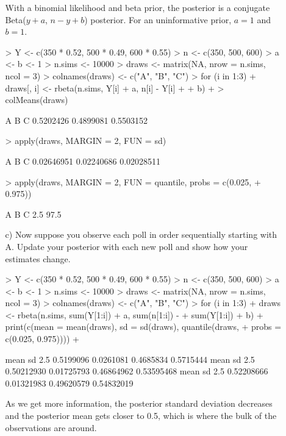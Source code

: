 \documentclass[10pt,a4paper]{article}
\newcommand{\red}{\color{red}}
\newcommand{\black}{\color{black}}
\begin{document}
\begin{enumerate}
\begin{itemize}
\medskip \red
With a binomial likelihood and beta prior, the posterior is a conjugate Beta($y+a$, $n-y+b$) posterior.  For an uninformative prior, $a=1$ and $b=1$. \\
\medskip
\small
\begin{Schunk}
\begin{Sinput}
> Y <- c(350 * 0.52, 500 * 0.49, 600 * 0.55)
> n <- c(350, 500, 600)
> a <- b <- 1
> n.sims <- 10000
> draws <- matrix(NA, nrow = n.sims, ncol = 3)
> colnames(draws) <- c("A", "B", "C")
> for (i in 1:3) {
+     draws[, i] <- rbeta(n.sims, Y[i] + a, n[i] - Y[i] + 
+         b)
+ }
> colMeans(draws)
\end{Sinput}
\begin{Soutput}
        A         B         C 
0.5202426 0.4899081 0.5503152 
\end{Soutput}
\begin{Sinput}
> apply(draws, MARGIN = 2, FUN = sd)
\end{Sinput}
\begin{Soutput}
         A          B          C 
0.02646951 0.02240686 0.02028511 
\end{Soutput}
\begin{Sinput}
> apply(draws, MARGIN = 2, FUN = quantile, probs = c(0.025, 
+     0.975))
\end{Sinput}
\begin{Soutput}
              A         B         C
2.5%  0.4681027 0.4463045 0.5102297
97.5% 0.5718493 0.5337669 0.5898281
\end{Soutput}
\end{Schunk}
\normalsize \medskip \black 

\item[c)] Now suppose you observe each poll in order sequentially starting with A.  Update your posterior with each new poll and show how your estimates change.\\

\medskip \red \small
\begin{Schunk}
\begin{Sinput}
> Y <- c(350 * 0.52, 500 * 0.49, 600 * 0.55)
> n <- c(350, 500, 600)
> a <- b <- 1
> n.sims <- 10000
> draws <- matrix(NA, nrow = n.sims, ncol = 3)
> colnames(draws) <- c("A", "B", "C")
> for (i in 1:3) {
+     draws <- rbeta(n.sims, sum(Y[1:i]) + a, sum(n[1:i]) - 
+         sum(Y[1:i]) + b)
+     print(c(mean = mean(draws), sd = sd(draws), quantile(draws, 
+         probs = c(0.025, 0.975))))
+ }
\end{Sinput}
\begin{Soutput}
     mean        sd      2.5%     97.5% 
0.5199096 0.0261081 0.4685834 0.5715444 
      mean         sd       2.5%      97.5% 
0.50212930 0.01725793 0.46864962 0.53595468 
      mean         sd       2.5%      97.5% 
0.52208666 0.01321983 0.49620579 0.54832019 
\end{Soutput}
\end{Schunk}
\medskip
\normalsize As we get more information, the posterior standard deviation decreases and the posterior mean gets closer to 0.5, which is where the bulk of the observations are around.\\
\medskip \black 


\end{itemize}
\end{enumerate}
\end{document}
